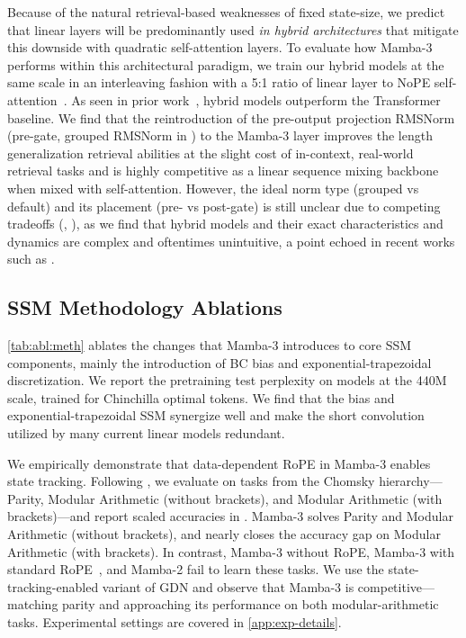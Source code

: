 Because of the natural retrieval-based weaknesses of fixed state-size, we predict that linear layers will be predominantly used \emph{in hybrid architectures} that mitigate this downside with quadratic self-attention layers.
To evaluate how Mamba-3 performs within this architectural paradigm, we train our hybrid models at the same scale in an interleaving fashion with a 5:1 ratio of linear layer to NoPE self-attention~\citep{yang2025ropenopeagainnew}.
As seen in prior work~\citep{waleffe2024empiricalstudymambabasedlanguage}, hybrid models outperform the Transformer baseline.
We find that the reintroduction of the pre-output projection RMSNorm (pre-gate, grouped RMSNorm in ) to the Mamba-3 layer improves the length generalization retrieval abilities at the slight cost of in-context, real-world retrieval tasks and is highly competitive as a linear sequence mixing backbone when mixed with self-attention.
However, the ideal norm type (grouped vs default) and its placement (pre- vs post-gate) is still unclear due to competing tradeoffs (, ), as we find that hybrid models and their exact characteristics and dynamics are complex and oftentimes unintuitive, a point echoed in 
recent works such as \citet{cabannes2025shortwindowattentionenables}.

\combinedniahretrievaltable

\subsection{SSM Methodology Ablations}
\label{sec:exp:meth-abl}
\ablationstable

\cref{tab:abl:meth} ablates the changes that Mamba-3 introduces to core SSM components, mainly the introduction of BC bias and exponential-trapezoidal discretization. We report the pretraining test perplexity on models at the 440M scale, trained for Chinchilla optimal tokens. We find that the bias and exponential-trapezoidal SSM synergize well and make the short convolution utilized by many current linear models redundant.

We empirically demonstrate that data-dependent RoPE in Mamba-3 enables state tracking.
Following \citet{grazzi2025unlockingstatetrackinglinearrnns}, we evaluate on tasks from the Chomsky hierarchy---Parity, Modular Arithmetic (without brackets), and Modular Arithmetic (with brackets)---and report scaled accuracies in .
Mamba-3 solves Parity and Modular Arithmetic (without brackets), and nearly closes the accuracy gap on Modular Arithmetic (with brackets).
In contrast, Mamba-3 without RoPE, Mamba-3 with standard RoPE~\citep{su2023roformerenhancedtransformerrotary}, and Mamba-2 fail to learn these tasks.
We use the state-tracking-enabled variant of GDN and observe that Mamba-3 is competitive---matching parity and approaching its performance on both modular-arithmetic tasks. Experimental settings are covered in \cref{app:exp-details}.


